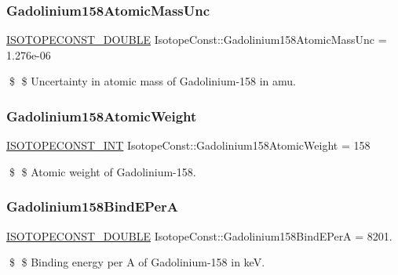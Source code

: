 \subsubsection{\texorpdfstring{Gadolinium158\+Atomic\+Mass\+Unc}{Gadolinium158AtomicMassUnc}}
{\footnotesize\ttfamily \mbox{\hyperlink{group___isotope_const-_macros_ga8f45a7272ce02c0b4c65c44636ed719a}{I\+S\+O\+T\+O\+P\+E\+C\+O\+N\+S\+T\+\_\+\+D\+O\+U\+B\+LE}} Isotope\+Const\+::\+Gadolinium158\+Atomic\+Mass\+Unc = 1.\+276e-\/06}

\$ \$ Uncertainty in atomic mass of Gadolinium-\/158 in amu. \mbox{\label{group___isotope_const-_gadolinium-_gd158_gad67436e5b3302be167da8adae10c523a}} 
\subsubsection{\texorpdfstring{Gadolinium158\+Atomic\+Weight}{Gadolinium158AtomicWeight}}
{\footnotesize\ttfamily \mbox{\hyperlink{group___isotope_const-_macros_ga5f18360b3e99483a35c32d789e62621c}{I\+S\+O\+T\+O\+P\+E\+C\+O\+N\+S\+T\+\_\+\+I\+NT}} Isotope\+Const\+::\+Gadolinium158\+Atomic\+Weight = 158}

\$ \$ Atomic weight of Gadolinium-\/158. \mbox{\label{group___isotope_const-_gadolinium-_gd158_gae020b59696fb111ffdd55b3f88141760}} 
\subsubsection{\texorpdfstring{Gadolinium158\+Bind\+E\+PerA}{Gadolinium158BindEPerA}}
{\footnotesize\ttfamily \mbox{\hyperlink{group___isotope_const-_macros_ga8f45a7272ce02c0b4c65c44636ed719a}{I\+S\+O\+T\+O\+P\+E\+C\+O\+N\+S\+T\+\_\+\+D\+O\+U\+B\+LE}} Isotope\+Const\+::\+Gadolinium158\+Bind\+E\+PerA = 8201.}

\$ \$ Binding energy per A of Gadolinium-\/158 in keV. \mbox{\label{group___isotope_const-_gadolinium-_gd158_ga771b079d8d87e7826cfde79ef2d7da65}} 

